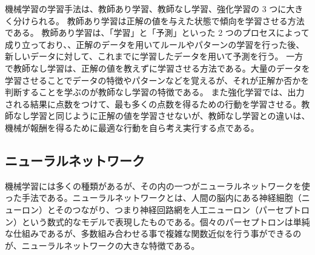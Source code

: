 機械学習の学習手法は、教師あり学習、教師なし学習、強化学習の 3 つに大きく分けられる。
教師あり学習は正解の値を与えた状態で傾向を学習させる方法である。
教師あり学習は、「学習」と「予測」といった 2 つのプロセスによって成り立っており、、正解のデータを用いてルールやパターンの学習を行った後、新しいデータに対して、これまでに学習したデータを用いて予測を行う。
一方で教師なし学習は、正解の値を教えずに学習させる方法である。大量のデータを学習させることでデータの特徴やパターンなどを覚えるが、それが正解か否かを判断することを学ぶのが教師なし学習の特徴である。
また強化学習では、出力される結果に点数をつけて、最も多くの点数を得るための行動を学習させる。教師なし学習と同じように正解の値を学習させないが、教師なし学習との違いは、機械が報酬を得るために最適な行動を自ら考え実行する点である。

\subsection{ニューラルネットワーク}
機械学習には多くの種類があるが、その内の一つがニューラルネットワークを使った手法である。ニューラルネットワークとは、人間の脳内にある神経細胞（ニューロン）とそのつながり、つまり神経回路網を人工ニューロン（パーセプトロン）という数式的なモデルで表現したものである。個々のパーセプトロンは単純な仕組みであるが、多数組み合わせる事で複雑な関数近似を行う事ができるのが、ニューラルネットワークの大きな特徴である。

